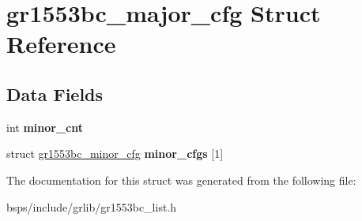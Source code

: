 \hypertarget{structgr1553bc__major__cfg}{}\section{gr1553bc\+\_\+major\+\_\+cfg Struct Reference}
\label{structgr1553bc__major__cfg}
\subsection*{Data Fields}
\begin{DoxyCompactItemize}
\item 
\mbox{\label{structgr1553bc__major__cfg_aaa96865259cf5a66fc94733c675633bd}} 
int {\bfseries minor\+\_\+cnt}
\item 
\mbox{\label{structgr1553bc__major__cfg_a754fb8f86494de873fca6b0c625f541e}} 
struct \mbox{\hyperlink{structgr1553bc__minor__cfg}{gr1553bc\+\_\+minor\+\_\+cfg}} {\bfseries minor\+\_\+cfgs} \mbox{[}1\mbox{]}
\end{DoxyCompactItemize}


The documentation for this struct was generated from the following file\+:\begin{DoxyCompactItemize}
\item 
bsps/include/grlib/gr1553bc\+\_\+list.\+h\end{DoxyCompactItemize}
